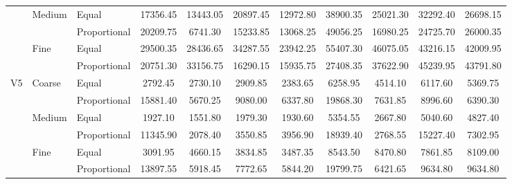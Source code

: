 \documentclass[10pt,journal,compsoc]{IEEEtran}
\begin{document}
\begin{table*}
\begin{tabular}{|c|l|l|c|c|c|c|c|c|c|c|}
	& Medium	& Equal	& 17356.45	& 13443.05	& 20897.45	& 12972.80	& 38900.35	& 25021.30	& 32292.40	& 26698.15	 \\ \cline{3-11}
	& 	& Proportional	& 20209.75	& 6741.30	& 15233.85	& 13068.25	& 49056.25	& 16980.25	& 24725.70	& 26000.35	 \\ \cline{2-11}
	& Fine	& Equal	& 29500.35	& 28436.65	& 34287.55	& 23942.25	& 55407.30	& 46075.05	& 43216.15	& 42009.95	 \\ \cline{3-11}
	& 	& Proportional	& 20751.30	& 33156.75	& 16290.15	& 15935.75	& 27408.35	& 37622.90	& 45239.95	& 43791.80	 \\ \hline
V5	& Coarse	& Equal	& 2792.45	& 2730.10	& 2909.85	& 2383.65	& 6258.95	& 4514.10	& 6117.60	& 5369.75	 \\ \cline{3-11}
	& 	& Proportional	& 15881.40	& 5670.25	& 9080.00	& 6337.80	& 19868.30	& 7631.85	& 8996.60	& 6390.30	 \\ \cline{2-11}
	& Medium	& Equal	& 1927.10	& 1551.80	& 1979.30	& 1930.60	& 5354.55	& 2667.80	& 5040.60	& 4827.40	 \\ \cline{3-11}
	& 	& Proportional	& 11345.90	& 2078.40	& 3550.85	& 3956.90	& 18939.40	& 2768.55	& 15227.40	& 7302.95	 \\ \cline{2-11}
	& Fine	& Equal	& 3091.95	& 4660.15	& 3834.85	& 3487.35	& 8543.50	& 8470.80	& 7861.85	& 8109.00	 \\ \cline{3-11}
	& 	& Proportional	& 13897.55	& 5918.45	& 7772.65	& 5844.20	& 19799.75	& 6421.65	& 9634.80	& 9634.80	 \\ \hline
\end{tabular}
\end{table*}
\end{document}
